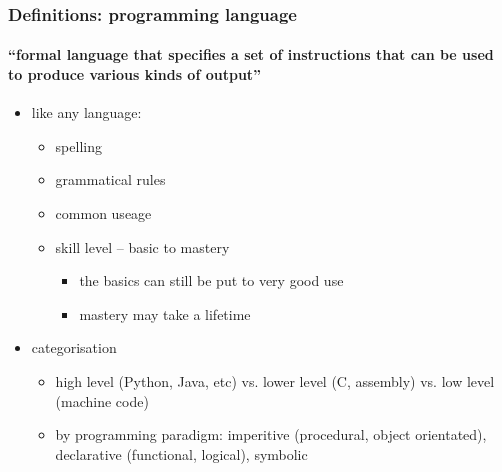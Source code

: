 \documentclass{beamer}
\begin{document}
    \begin{frame}
	    \frametitle{Definitions: programming language}
	    \framesubtitle{``formal language that specifies a set of instructions that can be used to produce various kinds of output''}
	    \begin{itemize}
		    \item like any language:
			    \begin{itemize}
				    \item spelling
				    \item grammatical rules
				    \item common useage
				    \item skill level -- basic to mastery 
					    \begin{itemize}
						    \item the basics can still be put to very good use
						    \item mastery may take a lifetime
					    \end{itemize}
			    \end{itemize}
	    \end{itemize}
			   \begin{itemize}
				   \item categorisation
					   \begin{itemize}
						   \item high level (Python, Java, etc) vs. lower level (C, assembly) vs. low level (machine code)
						   \item by programming paradigm: imperitive (procedural, object orientated), declarative (functional, logical), symbolic
					   \end{itemize} 
			   \end{itemize}
    \end{frame}
\end{document}
